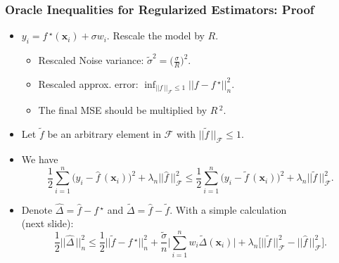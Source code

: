 \documentclass[11pt]{beamer}
\newcommand{\bx}{\mathbf{x}}
\newcommand{\cF}{\mathcal{F}}
\newcommand{\fstar}{f\,^\star}
\newcommand{\fhat}{\widehat{f}}
\newcommand{\ftilde}{\widetilde{f}}
\newcommand{\Dhat}{\widehat{\Delta}}
\newcommand{\Dtilde}{\widetilde{\Delta}}
\begin{document}
	\begin{frame}
		\frametitle{Oracle Inequalities for Regularized Estimators: Proof}
		\begin{itemize}
			\item $y_i = f\,^\star (\bx_i) + \sigma w_i$. Rescale the model by $R$.
			\begin{itemize}
				\item  Rescaled Noise variance: $\tilde{\sigma}^2 = \big(\frac{\sigma}{R}\big)^2$. 
				\item  Rescaled approx. error: $\inf_{||f\,||_\cF\leq 1} ||f-\fstar||_n^2$.
				\item The final MSE should be multiplied by $R\,^2$.
			\end{itemize}
			\item Let $\ftilde$ be an arbitrary element in $\cF$ with $||\ftilde\,||_\cF\leq 1$.
			\item We have
			\begin{equation*}
				\frac{1}{2}\sum_{i = 1}^{n} \big(y_i - \fhat\,(\bx_i)\big)^2 + \lambda_n ||\fhat\,||_\cF^2 \leq \frac{1}{2}\sum_{i = 1}^{n} \big(y_i - \ftilde\,(\bx_i)\big)^2 + \lambda_n ||\ftilde\,||_\cF^2.
			\end{equation*}
			\item Denote $\Dhat = \fhat - \fstar$ and $\Dtilde = \fhat - \ftilde$. With a simple calculation\\ (next slide):			
			\begin{equation*}
				\frac{1}{2}||\Dhat\,||_n^2 \leq \frac{1}{2}||\ftilde - \fstar||_n^2 + \frac{\widetilde\sigma}{n}\Big|\sum_{i = 1}^{n}w_i \Dtilde(\bx_i)\Big| + \lambda_n \big[||\ftilde\,||_\cF^2 - ||\fhat\,||_\cF^2\big].
			\end{equation*}
		\end{itemize}
	\end{frame}
\end{document}
